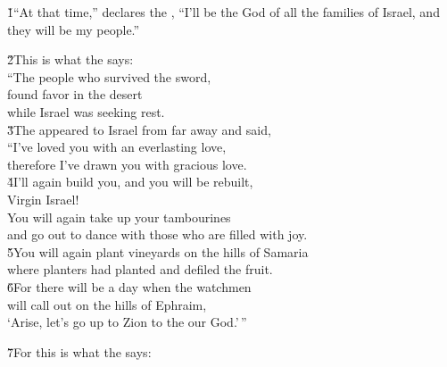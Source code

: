 
\v{1}``At that time,'' declares the , ``I'll be the God of all the families of Israel, and they will be my people.''

\begin{poetry}
\poeml \v{2}This is what the  says: \\
\poeml ``The people who survived the sword, \\
\poemll    found favor in the desert \\
\poemlll       while Israel was seeking rest. \\
\poeml \v{3}The  appeared to Israel from far away and said, \\
\poemll    ``I've loved you with an everlasting love, \\
\poemlll       therefore I've drawn you with gracious love. \\
\poeml \v{4}I'll again build you, and you will be rebuilt, \\
\poemll    Virgin Israel! \\
\poeml You will again take up your tambourines \\
\poemll    and go out to dance with those who are filled with joy. \\
\poeml \v{5}You will again plant vineyards on the hills of Samaria \\
\poemll    where planters had planted and defiled the fruit. \\
\poeml \v{6}For there will be a day when the watchmen \\
\poemll    will call out on the hills of Ephraim, \\
\poemll    `Arise, let's go up to Zion to the  our God.'\,''
\end{poetry}

\begin{poetry}
\poeml \v{7}For this is what the  says:
\end{poetry}

